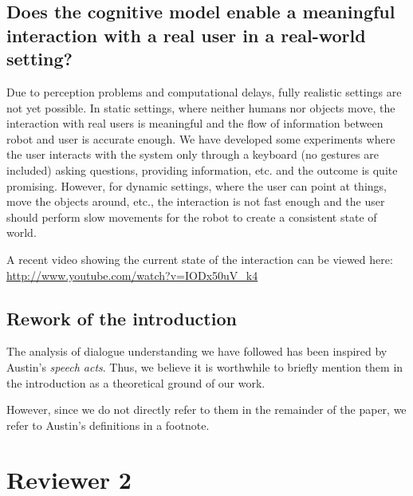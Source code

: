 \documentclass[11pt]{article}
\begin{document}
\subsection{Does the cognitive model enable a meaningful interaction with a
real user in a real-world setting?}

Due to perception problems and computational delays, fully realistic settings
are not yet possible. In static settings, where neither humans nor objects
move, the interaction with real users is meaningful and the flow of information
between robot and user is accurate enough.  We have developed some experiments
where the user interacts with the system only through a keyboard (no gestures
are included) asking questions, providing information, etc. and the outcome is
quite promising. However, for dynamic settings, where the user can point at
things, move the objects around, etc., the interaction is not fast enough and
the user should perform slow movements for the robot to create a consistent
state of world.

A recent video showing the current state of the interaction can be viewed
here: \url{http://www.youtube.com/watch?v=IODx50uV_k4}

\subsection{Rework of the introduction} 


The analysis of dialogue understanding we have followed has been inspired by
Austin's \emph{speech acts}. Thus, we believe it is worthwhile to briefly mention
them in the introduction as a theoretical ground of our work. 

However, since we do not directly refer to them in the remainder of the paper,
we refer to Austin's definitions in a footnote.

\section{Reviewer 2}
\end{document}
